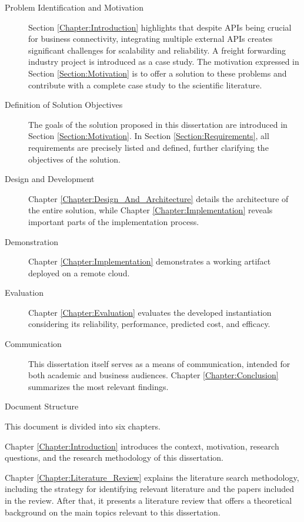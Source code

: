 \documentclass[12pt, reqno]{amsbook}
\makeatletter
\def\section{\@startsection{section}{1}%
      \z@{.5\linespacing\@plus.7\linespacing}{.25\linespacing}%
      {\normalfont\bfseries\flushleft}}
\theoremstyle{definition}
\theoremstyle{definition}
\numberwithin{section}{chapter}
\numberwithin{table}{chapter}
\numberwithin{figure}{chapter}
\makeatother
\begin{document}
\begin{description}
  \item [Problem Identification and Motivation] Section \ref{Chapter:Introduction} highlights that despite \acp{API} being crucial for business connectivity, integrating multiple external \acp{API} creates significant challenges for scalability and reliability. A freight forwarding industry project is introduced as a case study. The motivation expressed in Section \ref{Section:Motivation} is to offer a solution to these problems and contribute with a complete case study to the scientific literature.
  \item [Definition of Solution Objectives] The goals of the solution proposed in this dissertation are introduced in Section \ref{Section:Motivation}. In Section \ref{Section:Requirements}, all requirements are precisely listed and defined, further clarifying the objectives of the solution.
  \item [Design and Development] Chapter \ref{Chapter:Design_And_Architecture} details the architecture of the entire solution, while Chapter \ref{Chapter:Implementation} reveals important parts of the implementation process.
  \item [Demonstration] Chapter \ref{Chapter:Implementation} demonstrates a working artifact deployed on a remote cloud.
  \item [Evaluation] Chapter \ref{Chapter:Evaluation} evaluates the developed instantiation considering its reliability, performance, predicted cost, and efficacy.
  \item [Communication] This dissertation itself serves as a means of communication, intended for both academic and business audiences. Chapter \ref{Chapter:Conclusion} summarizes the most relevant findings.
\end{description}

\section{Document Structure}
\label{Section:Document_Structure}

This document is divided into six chapters.

Chapter \ref{Chapter:Introduction} introduces the context, motivation, research questions, and the research methodology of this dissertation.

Chapter \ref{Chapter:Literature_Review} explains the literature search methodology, including the strategy for identifying relevant literature and the papers included in the review. After that, it presents a literature review that offers a theoretical background on the main topics relevant to this dissertation.
\end{document}
